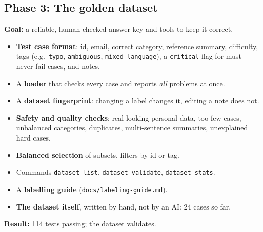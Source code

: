 \documentclass[11pt,a4paper]{article}
\newcommand{\code}[1]{\nolinkurl{#1}}
\begin{document}
\subsection{Phase 3: The golden dataset}
\textbf{Goal:} a reliable, human-checked answer key and tools to keep it correct.
\begin{itemize}
  \item \textbf{Test case format}: id, email, correct category, reference summary, difficulty,
        tags (e.g.\ \code{typo}, \code{ambiguous}, \code{mixed_language}), a \code{critical}
        flag for must-never-fail cases, and notes.
  \item A \textbf{loader} that checks every case and reports \emph{all} problems at once.
  \item A \textbf{dataset fingerprint}: changing a label changes it, editing a note does not.
  \item \textbf{Safety and quality checks}: real-looking personal data, too few cases,
        unbalanced categories, duplicates, multi-sentence summaries, unexplained hard cases.
  \item \textbf{Balanced selection} of subsets, filters by id or tag.
  \item Commands \texttt{dataset list}, \texttt{dataset validate}, \texttt{dataset stats}.
  \item A \textbf{labelling guide} (\code{docs/labeling-guide.md}).
  \item \textbf{The dataset itself}, written by hand, not by an AI: 24 cases so far.
\end{itemize}
\textbf{Result:} 114 tests passing; the dataset validates.
\end{document}
